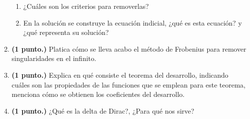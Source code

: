 \begin{enumerate}
\begin{enumerate}[label=\alph*)]
\item ¿Cuáles son los criterios para removerlas?
\item En la solución se construye la ecuación indicial, ¿qué es esta ecuación? y ¿qué representa su solución?
\end{enumerate}
\item \textbf{(1 punto.)} Platica cómo se lleva acabo el método de Frobenius para remover singularidades en el infinito.
\item \textbf{(1 punto.)} Explica en qué consiste el teorema del desarrollo, indicando cuáles son las propiedades de las funciones que se emplean para este teorema, menciona cómo se obtienen los coeficientes del desarrollo.
\item \textbf{(1 punto.)} ¿Qué es la delta de Dirac?, ¿Para qué nos sirve?
\end{enumerate}
